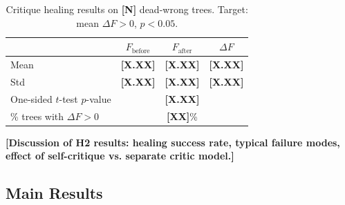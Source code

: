 \documentclass{article} %
\newcommand{\placeholder}[1]{{\color{red}\textbf{[#1]}}}
\begin{document}
\begin{table}[h]
\centering
\begin{tabular}{lccc}
\toprule
& \textbf{$F_\text{before}$} & \textbf{$F_\text{after}$} & \textbf{$\Delta F$} \\
\midrule
Mean & \placeholder{X.XX} & \placeholder{X.XX} & \placeholder{X.XX} \\
Std & \placeholder{X.XX} & \placeholder{X.XX} & \placeholder{X.XX} \\
\midrule
One-sided $t$-test $p$-value & \multicolumn{3}{c}{\placeholder{X.XX}} \\
\% trees with $\Delta F > 0$ & \multicolumn{3}{c}{\placeholder{XX}\%} \\
\bottomrule
\end{tabular}
\caption{Critique healing results on \placeholder{N} dead-wrong trees. Target: mean $\Delta F > 0$, $p < 0.05$.}
\label{tab:h2}
\end{table}

\placeholder{Discussion of H2 results: healing success rate, typical failure modes, effect of self-critique vs. separate critic model.}


\subsection{Main Results}
\end{document}
